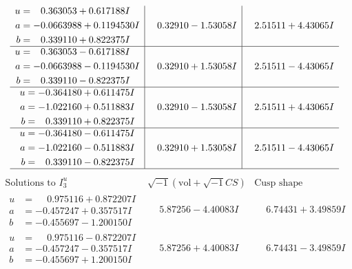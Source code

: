 \documentclass[1p]{elsarticle_modified}
\theoremstyle{definition}
\newcommand{\I}{\sqrt{-1}}
\begin{document}
$$\begin{array}{c|c|c}
\begin{aligned}
u &= \phantom{-}0.363053 + 0.617188 I \\
a &= -0.0663988 + 0.1194530 I \\
b &= \phantom{-}0.339110 + 0.822375 I\end{aligned}
 & \phantom{-}0.32910 - 1.53058 I & \phantom{-}2.51511 + 4.43065 I \\ \hline\begin{aligned}
u &= \phantom{-}0.363053 - 0.617188 I \\
a &= -0.0663988 - 0.1194530 I \\
b &= \phantom{-}0.339110 - 0.822375 I\end{aligned}
 & \phantom{-}0.32910 + 1.53058 I & \phantom{-}2.51511 - 4.43065 I \\ \hline\begin{aligned}
u &= -0.364180 + 0.611475 I \\
a &= -1.022160 + 0.511883 I \\
b &= \phantom{-}0.339110 + 0.822375 I\end{aligned}
 & \phantom{-}0.32910 - 1.53058 I & \phantom{-}2.51511 + 4.43065 I \\ \hline\begin{aligned}
u &= -0.364180 - 0.611475 I \\
a &= -1.022160 - 0.511883 I \\
b &= \phantom{-}0.339110 - 0.822375 I\end{aligned}
 & \phantom{-}0.32910 + 1.53058 I & \phantom{-}2.51511 - 4.43065 I\\
 \hline 
 \end{array}$$\newpage$$\begin{array}{c|c|c}  
\text{Solutions to }I^u_{3}& \I (\text{vol} + \sqrt{-1}CS) & \text{Cusp shape}\\
 \hline 
\begin{aligned}
u &= \phantom{-}0.975116 + 0.872207 I \\
a &= -0.457247 + 0.357517 I \\
b &= -0.455697 - 1.200150 I\end{aligned}
 & \phantom{-}5.87256 - 4.40083 I & \phantom{-}6.74431 + 3.49859 I \\ \hline\begin{aligned}
u &= \phantom{-}0.975116 - 0.872207 I \\
a &= -0.457247 - 0.357517 I \\
b &= -0.455697 + 1.200150 I\end{aligned}
 & \phantom{-}5.87256 + 4.40083 I & \phantom{-}6.74431 - 3.49859 I \\ \hline\begin{aligned}

\end{aligned}
\end{array}$$
\end{document}
